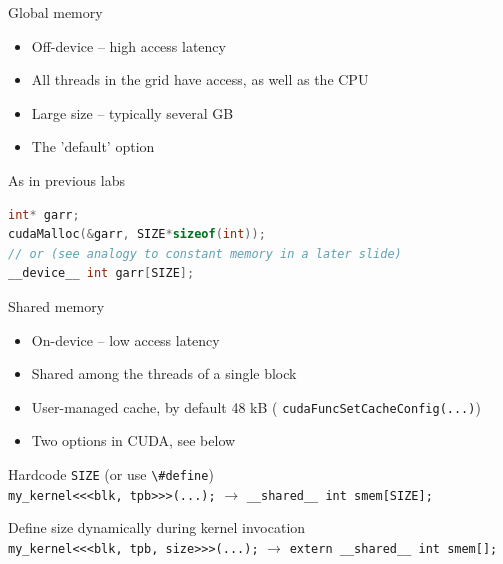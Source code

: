\documentclass[11pt,t]{beamer}
\newcommand{\inline}[1]{ \colorbox{mygray}{\lstinline{#1}}}
\begin{document}
\begin{frame}[fragile]{Global memory}

    \begin{itemize}
        \item Off-device -- high access latency
        \item All threads in the grid have access, as well as the CPU
        \item Large size -- typically several GB
        \item The 'default' option
    \end{itemize}
    
    \vspace{4mm}
    As in previous labs
\begin{lstlisting}[language=C++]
int* garr;
cudaMalloc(&garr, SIZE*sizeof(int));
// or (see analogy to constant memory in a later slide)
__device__ int garr[SIZE];
\end{lstlisting}
    
\end{frame}


\begin{frame}{Shared memory}

    \begin{itemize}
        \item On-device -- low access latency
        \item Shared among the threads of a single block
        \item User-managed cache, by default 48 kB (\inline{cudaFuncSetCacheConfig(...)})
        \item Two options in CUDA, see below
    \end{itemize}
    
    \vspace{4mm}
    Hardcode \inline{SIZE} (or use \inline{\#define}) \\
    \inline{my_kernel<<<blk, tpb>>>(...);} $\rightarrow$ \inline{__shared__ int smem[SIZE];}
    
    \vspace{4mm}
    Define size dynamically during kernel invocation \\
    \inline{my_kernel<<<blk, tpb, size>>>(...);} $\rightarrow$ \inline{extern __shared__ int smem[];}
    
\end{frame}
\end{document}
